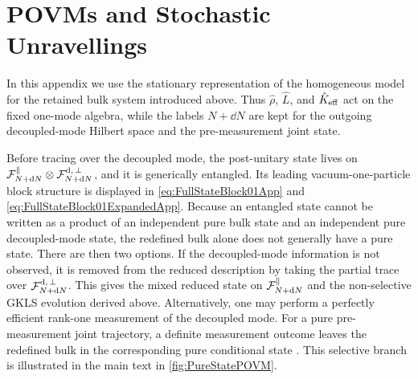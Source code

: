 \documentclass{article}
\def\cF{{\cal F}}
\numberwithin{equation}{section}
\begin{document}
	\section{POVMs and Stochastic Unravellings}
	\label{appA:povm_unravellings}

	In this appendix we use the stationary representation of the homogeneous model for the retained bulk system introduced above. Thus \(\hat\rho\), \(\hat L\), and \(\hat K_{\rm eff}\) act on the fixed one-mode algebra, while the labels \(N+\dd N\) are kept for the outgoing decoupled-mode Hilbert space and the pre-measurement joint state.

	Before tracing over the decoupled mode, the post-unitary state lives on \(\cF_{N+\dd N}^\parallel\otimes\cF^{\rm d,\,\perp}_{N+\dd N} \), and it is generically entangled. Its leading vacuum-one-particle block structure is displayed in \cref{eq:FullStateBlock01App} and \eqref{eq:FullStateBlock01ExpandedApp}. Because an entangled state cannot be written as a product of an independent pure bulk state and an independent pure decoupled-mode state, the redefined bulk alone does not generally have a pure state. There are then two options. If the decoupled-mode information is not observed, it is removed from the reduced description by taking the partial trace over \(\cF^{\rm d,\,\perp}_{N+\dd N}\). This gives the mixed reduced state on \(\cF_{N+\dd N}^\parallel\) and the non-selective GKLS evolution derived above. Alternatively, one may perform a perfectly efficient rank-one measurement of the decoupled mode. For a pure pre-measurement joint trajectory, a definite measurement outcome leaves the redefined bulk in the corresponding pure conditional state \cite{wiseman2009quantum}. This selective branch is illustrated in the main text in \cref{fig:PureStatePOVM}.
\end{document}
